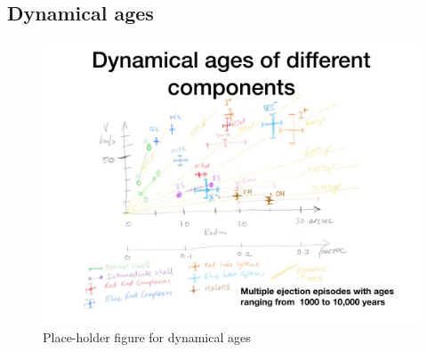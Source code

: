 \documentclass[useAMS, usenatbib]{mnras}
\begin{document}
\subsection{Dynamical ages}
\label{sec:dynamical-ages}

\begin{figure}
  \includegraphics[width=\linewidth]
  {talk-figs/turtle-talk-morelia-2020-02-export-013}
  \caption{Place-holder figure for dynamical ages}
  \label{fig:ages}
\end{figure}







\bsp	%
\label{lastpage}
\end{document}

